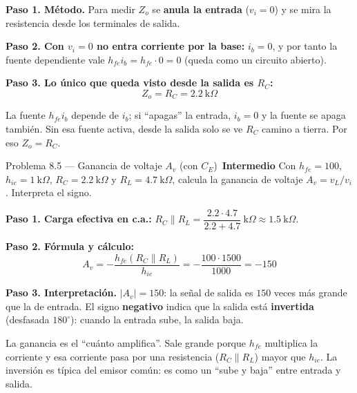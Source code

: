 \documentclass[11pt,a4paper]{article}
\newcommand{\intermedio}{\textcolor{naranjaVivo}{\faIcon{circle}\,\textbf{Intermedio}}}
\begin{document}
\begin{solucionBox}
\textbf{Paso 1. Método.} Para medir $Z_o$ se \textbf{anula la entrada} ($v_i=0$) y se mira la resistencia desde los terminales de salida.

\textbf{Paso 2. Con $v_i=0$ no entra corriente por la base:} $i_b=0$, y por tanto la fuente dependiente vale $h_{fe}i_b=h_{fe}\cdot0=0$ (queda como un circuito abierto).

\textbf{Paso 3. Lo único que queda visto desde la salida es $R_C$:}
\[
Z_o=R_C=2.2\ \text{k}\Omega
\]
\end{solucionBox}

\begin{porqueBox}
La fuente $h_{fe}i_b$ depende de $i_b$; si ``apagas'' la entrada, $i_b=0$ y la fuente se apaga también. Sin esa fuente activa, desde la salida solo se ve $R_C$ camino a tierra. Por eso $Z_o=R_C$.
\end{porqueBox}

\begin{problemaBox}{Problema 8.5 --- Ganancia de voltaje $A_v$ (con $C_E$) \quad \intermedio}
Con $h_{fe}=100$, $h_{ie}=1\ \text{k}\Omega$, $R_C=2.2\ \text{k}\Omega$ y $R_L=4.7\ \text{k}\Omega$, calcula la ganancia de voltaje $A_v=v_L/v_i$. Interpreta el signo.
\end{problemaBox}

\begin{solucionBox}
\textbf{Paso 1. Carga efectiva en c.a.:} $R_C\parallel R_L=\dfrac{2.2\cdot4.7}{2.2+4.7}\ \text{k}\Omega\approx1.5\ \text{k}\Omega$.

\textbf{Paso 2. Fórmula y cálculo:}
\[
A_v=-\frac{h_{fe}(R_C\parallel R_L)}{h_{ie}}=-\frac{100\cdot1500}{1000}=-150
\]

\textbf{Paso 3. Interpretación.} $|A_v|=150$: la señal de salida es $150$ veces más grande que la de entrada. El signo \textbf{negativo} indica que la salida está \textbf{invertida} (desfasada $180^\circ$): cuando la entrada sube, la salida baja.
\end{solucionBox}

\begin{porqueBox}
La ganancia es el ``cuánto amplifica''. Sale grande porque $h_{fe}$ multiplica la corriente y esa corriente pasa por una resistencia ($R_C\parallel R_L$) mayor que $h_{ie}$. La inversión es típica del emisor común: es como un ``sube y baja'' entre entrada y salida.
\end{porqueBox}
\end{document}
